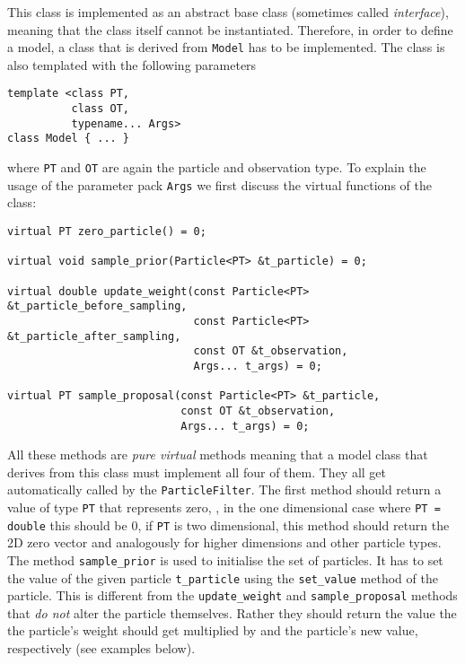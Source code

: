 This class is implemented as an abstract base class (sometimes called
\emph{interface}), meaning that the class itself cannot be
instantiated. Therefore, in order to define a model, a class that is
derived from \texttt{Model} has to be implemented. The class is also
templated with the following parameters
\begin{verbatim}
template <class PT, 
          class OT, 
          typename... Args> 
class Model { ... }
\end{verbatim}
where \texttt{PT} and \texttt{OT} are again the particle and
observation type. To explain the usage of the parameter pack
\texttt{Args} we first discuss the virtual functions of the class:
\begin{verbatim}
virtual PT zero_particle() = 0;

virtual void sample_prior(Particle<PT> &t_particle) = 0;

virtual double update_weight(const Particle<PT> &t_particle_before_sampling,
                             const Particle<PT> &t_particle_after_sampling,
                             const OT &t_observation, 
                             Args... t_args) = 0;

virtual PT sample_proposal(const Particle<PT> &t_particle,
                           const OT &t_observation, 
                           Args... t_args) = 0;
\end{verbatim}
All these methods are \emph{pure virtual} methods meaning that a model
class that derives from this class must implement all four of
them. They all get automatically called by the
\texttt{ParticleFilter}. The first method should return a value of
type \texttt{PT} that represents zero, \ie, in the one dimensional
case where \texttt{PT = double} this should be 0, if \texttt{PT} is
\eg two dimensional, this method should return the 2D zero vector and
analogously for higher dimensions and other particle types. The method
\texttt{sample\_prior} is used to initialise the set of particles. It
has to set the value of the given particle \texttt{t\_particle} using
the \texttt{set\_value} method of the particle. This is different from
the \texttt{update\_weight} and \texttt{sample\_proposal} methods that
\emph{do not} alter the particle themselves. Rather they should return
the value the the particle's weight should get multiplied by and the
particle's new value, respectively (see examples below).


